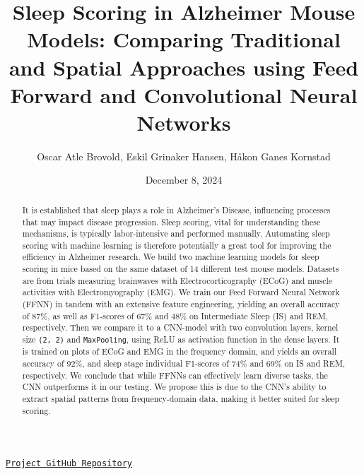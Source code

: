 \documentclass{article}
\title{Sleep Scoring in Alzheimer Mouse Models: Comparing Traditional and Spatial Approaches using Feed Forward and Convolutional Neural Networks}
\author{Oscar Atle Brovold, Eskil Grinaker Hansen, Håkon Ganes Kornstad}
\date{December 8, 2024}
\begin{document}
\maketitle
\begin{center}
    \href{https://github.com/EOH-ML/FYS-STK3155-Projects/tree/main/project3}{\texttt{Project GitHub Repository}}
\end{center}


\begin{abstract}
\noindent 
It is established that sleep plays a role in Alzheimer’s Disease, influencing processes that may impact disease progression. Sleep scoring, vital for understanding these mechanisms, is typically labor-intensive and performed manually. Automating sleep scoring with machine learning is therefore potentially a great tool for improving the efficiency in Alzheimer research. We build two machine learning models for sleep scoring in mice based on the same dataset of 14 different test mouse models. Datasets are from trials measuring brainwaves with Electrocorticography (ECoG) and muscle activities with Electromyography (EMG). We train our Feed Forward Neural Network (FFNN) in tandem with an extensive feature engineering, yielding an overall accuracy of 87\%, as well as F1-scores of 67\% and 48\% on Intermediate Sleep (IS) and REM, respectively. Then we compare it to a CNN-model with two convolution layers, kernel size \texttt{(2, 2)} and \texttt{MaxPooling}, using ReLU as activation function in the dense layers. It is trained on plots of ECoG and EMG in the frequency domain, and yields an overall accuracy of 92\%, and sleep stage individual F1-scores of 74\% and 69\% on IS and REM, respectively. We conclude that while FFNNs can effectively learn diverse tasks, the CNN outperforms it in our testing. We propose this is due to the CNN's ability to extract spatial patterns from frequency-domain data, making it better suited for sleep scoring.

\end{abstract}
\end{document}
